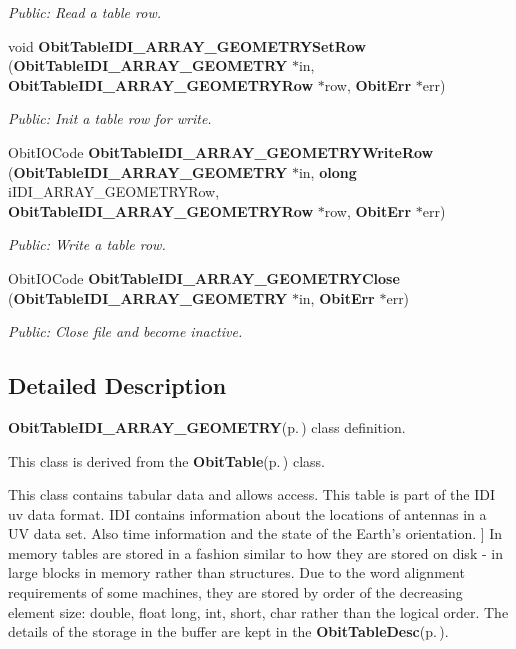 \begin{CompactItemize}
\begin{CompactList}\small\item\em Public: Read a table row. \item\end{CompactList}\item 
void {\bf Obit\-Table\-IDI\_\-ARRAY\_\-GEOMETRYSet\-Row} ({\bf Obit\-Table\-IDI\_\-ARRAY\_\-GEOMETRY} $\ast$in, {\bf Obit\-Table\-IDI\_\-ARRAY\_\-GEOMETRYRow} $\ast$row, {\bf Obit\-Err} $\ast$err)
\begin{CompactList}\small\item\em Public: Init a table row for write. \item\end{CompactList}\item 
Obit\-IOCode {\bf Obit\-Table\-IDI\_\-ARRAY\_\-GEOMETRYWrite\-Row} ({\bf Obit\-Table\-IDI\_\-ARRAY\_\-GEOMETRY} $\ast$in, {\bf olong} i\-IDI\_\-ARRAY\_\-GEOMETRYRow, {\bf Obit\-Table\-IDI\_\-ARRAY\_\-GEOMETRYRow} $\ast$row, {\bf Obit\-Err} $\ast$err)
\begin{CompactList}\small\item\em Public: Write a table row. \item\end{CompactList}\item 
Obit\-IOCode {\bf Obit\-Table\-IDI\_\-ARRAY\_\-GEOMETRYClose} ({\bf Obit\-Table\-IDI\_\-ARRAY\_\-GEOMETRY} $\ast$in, {\bf Obit\-Err} $\ast$err)
\begin{CompactList}\small\item\em Public: Close file and become inactive. \item\end{CompactList}\end{CompactItemize}


\subsection{Detailed Description}
{\bf Obit\-Table\-IDI\_\-ARRAY\_\-GEOMETRY}{\rm (p.\,\pageref{structObitTableIDI__ARRAY__GEOMETRY})} class definition. 

This class is derived from the {\bf Obit\-Table}{\rm (p.\,\pageref{structObitTable})} class.

This class contains tabular data and allows access. This table is part of the IDI uv data format. IDI contains information about the locations of antennas in a UV data set. Also time information and the state of the Earth's orientation. ]  In memory tables are stored in a fashion similar to how they are stored on disk - in large blocks in memory rather than structures. Due to the word alignment requirements of some machines, they are stored by order of the decreasing element size: double, float long, int, short, char rather than the logical order. The details of the storage in the buffer are kept in the {\bf Obit\-Table\-Desc}{\rm (p.\,\pageref{structObitTableDesc})}.

